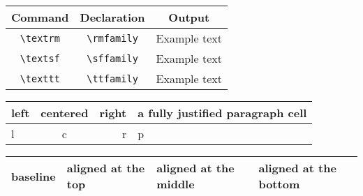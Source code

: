 \documentclass{article}
\newcommand{\head}[1]{\textnormal{\textbf{#1}}}
\begin{document}
\begin{tabular}{ccc}
  \hline
  \head{Command} & \head{Declaration} & \head{Output} \\
  \hline
  \verb|\textrm| & \verb|\rmfamily| & \rmfamily Example text \\
  \verb|\textsf| & \verb|\sffamily| & \sffamily Example text \\
  \verb|\texttt| & \verb|\ttfamily| & \ttfamily Example text \\
  \hline
\end{tabular}

\begin{tabular}{|l|c|r|p{1.7cm}|} %
  \hline
  left & centered & right & a fully justified paragraph cell \\
  \hline
  l & c & r & p \\
  \hline
\end{tabular}

\begin{tabular}{@{}lp{1.2cm}m{1.2cm}b{1.2cm}@{}}
  \hline
  baseline & aligned at the top & aligned at the middle & aligned at the bottom\\
  \hline
\end{tabular}
\end{document}
